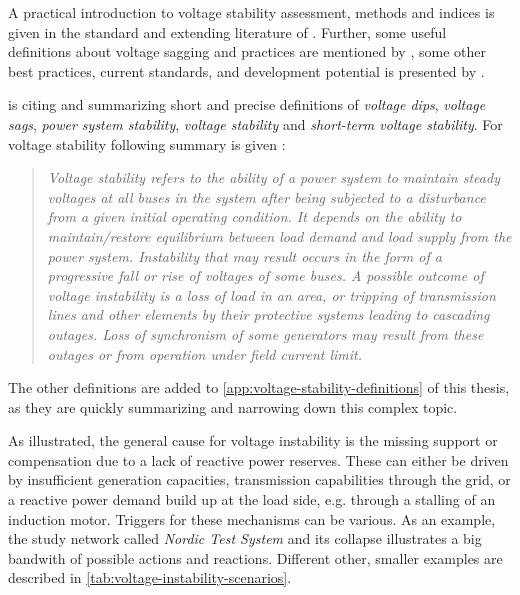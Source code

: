A practical introduction to voltage stability assessment, methods and indices is given in the standard and extending literature of \textcite{danish_2015,cutsem_1998}. Further, some useful definitions about voltage sagging and practices are mentioned by \textcite{shoup_2004}, some other best practices, current standards, and development potential is presented by \textcite{rueda-torres_2024}.

\textcite{shoup_2004} is citing and summarizing short and precise definitions of \textit{voltage dips}, \textit{voltage sags}, \textit{power system stability}, \textit{voltage stability} and \textit{short-term voltage stability}.
For voltage stability following summary is given \autocite{shoup_2004}:
\begin{quote}\itshape
    \glqq Voltage stability refers to the ability of a power system to maintain steady voltages at all buses in the system after being subjected to a disturbance from a given initial operating condition. 
    It depends on the ability to maintain/restore equilibrium between load demand and load supply from the power system. 
    Instability that may result occurs in the form of a progressive fall or rise of voltages of some buses. 
    A possible outcome of voltage instability is a loss of load in an area, or tripping of transmission lines and other elements by their protective systems leading to cascading outages. 
    Loss of synchronism of some generators may result from these outages or from operation under field current limit.\grqq
\end{quote}
The other definitions are added to \autoref{app:voltage-stability-definitions} of this thesis, as they are quickly summarizing and narrowing down this complex topic.

As illustrated, the general cause for voltage instability is the missing support or compensation due to a lack of reactive power reserves.
These can either be driven by insufficient generation capacities, transmission capabilities through the grid, or a reactive power demand build up at the load side, e.g. through a stalling of an induction motor.
Triggers for these mechanisms can be various.
As an example, the study network called \textit{Nordic Test System} and its collapse \autocite{vancutsem_2020} illustrates a big bandwith of possible actions and reactions.
Different other, smaller examples are described in \autoref{tab:voltage-instability-scenarios}.

